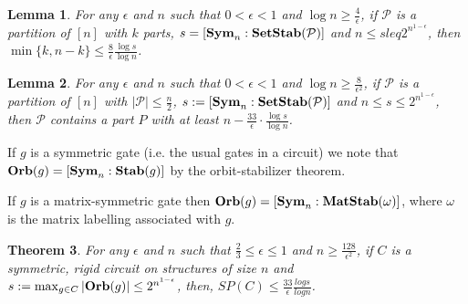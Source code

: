 \documentclass[12pt]{report}
\newtheorem{thm}{Theorem} \newtheorem{claim}[thm]{Claim}
\newtheorem{lem}[thm]{Lemma} \newtheorem{prop}[thm]{Proposition}
\newcommand{\stab}{\text{\textbf{Stab}}}
\newcommand{\setstab}{\text{\textbf{SetStab}}}
\newcommand{\matstab}{\text{\textbf{MatStab}}}
\newcommand{\sym}{\text{\textbf{Sym}}}
\newcommand{\orb}{\text{\textbf{Orb}}}
\begin{document}
\begin{lem}
  \label{lem:big-or-small}
  For any $\epsilon$ and $n$ such that $0 < \epsilon < 1$ and $\log n \geq
  \frac{4}{\epsilon}$, if $\mathcal{P}$ is a partition of $[n]$ with $k$ parts,
  $s = [\sym_n : \setstab (\mathcal{P})]$ and $n \leq s leq 2^{n^{1-\epsilon}}$,
  then $\min \{k, n-k\} \leq \frac{8}{\epsilon} \frac{\log s}{\log n}$.
\end{lem}

\begin{lem}
  \label{lem:small-means-support}
  For any $\epsilon$ and $n$ such that $0 < \epsilon < 1$ and $\log n \geq
  \frac{8}{\epsilon^2}$, if $\mathcal{P}$ is a partition of $[n]$ with $\vert
  \mathcal{P} \vert \leq \frac{n}{2}$, $s:= [\sym_n : \setstab (\mathcal{P})]$
  and $n \leq s \leq 2^{n^{1-\epsilon}}$, then $\mathcal{P}$ contains a part $P$
  with at least $n - \frac{33}{\epsilon} \cdot \frac{\log s} {\log n}$.
\end{lem}

If $g$ is a symmetric gate (i.e. the usual gates in a circuit) we note that
$\orb(g) = [\sym_n : \stab (g)]$ by the orbit-stabilizer theorem.

If $g$ is a matrix-symmetric gate then $\orb(g) = [\sym_n:\matstab (\omega)]$,
where $\omega$ is the matrix labelling associated with $g$.

\begin{thm}
  For any $\epsilon$ and $n$ such that $\frac{2}{3} \leq \epsilon \leq 1$ and $n
  \geq \frac{128}{\epsilon^2}$, if $C$ is a symmetric, rigid circuit on
  structures of size $n$ and $s := \max_{g \in C} \vert \orb (g)\vert \leq
  2^{n^{1-\epsilon}}$, then, $SP(C) \leq \frac{33}{\epsilon}\frac{log s}{log
    n}$.
\end{thm}
\end{document}
